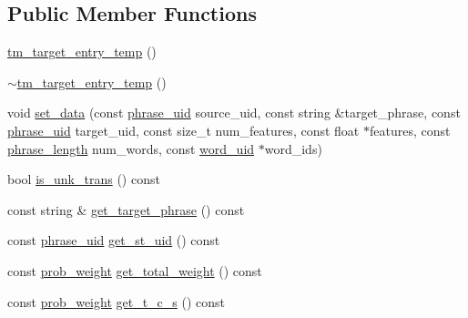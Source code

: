 \subsection*{Public Member Functions}
\begin{DoxyCompactItemize}
\item 
\hyperlink{classuva_1_1smt_1_1bpbd_1_1server_1_1tm_1_1models_1_1tm__target__entry__temp_a10d254c10a6cdeb7b5538d2fc1f29a96}{tm\+\_\+target\+\_\+entry\+\_\+temp} ()
\item 
\hyperlink{classuva_1_1smt_1_1bpbd_1_1server_1_1tm_1_1models_1_1tm__target__entry__temp_a07f3364da42bd07d8692ceefa95a60b3}{$\sim$tm\+\_\+target\+\_\+entry\+\_\+temp} ()
\item 
void \hyperlink{classuva_1_1smt_1_1bpbd_1_1server_1_1tm_1_1models_1_1tm__target__entry__temp_a019f83ab32f5b2b1c5becda8a0596732}{set\+\_\+data} (const \hyperlink{namespaceuva_1_1smt_1_1bpbd_1_1server_ad18d4cdf5504e76c22b0c124ff60b44f}{phrase\+\_\+uid} source\+\_\+uid, const string \&target\+\_\+phrase, const \hyperlink{namespaceuva_1_1smt_1_1bpbd_1_1server_ad18d4cdf5504e76c22b0c124ff60b44f}{phrase\+\_\+uid} target\+\_\+uid, const size\+\_\+t num\+\_\+features, const float $\ast$features, const \hyperlink{namespaceuva_1_1smt_1_1bpbd_1_1server_af068a19c2e03116caf3e3827a3e40e35}{phrase\+\_\+length} num\+\_\+words, const \hyperlink{namespaceuva_1_1smt_1_1bpbd_1_1server_a6bfe45ba344d65a7fdd7d26156328ddc}{word\+\_\+uid} $\ast$word\+\_\+ids)
\item 
bool \hyperlink{classuva_1_1smt_1_1bpbd_1_1server_1_1tm_1_1models_1_1tm__target__entry__temp_ae3569c030f9ddb80f02912f4f4ba724c}{is\+\_\+unk\+\_\+trans} () const 
\item 
const string \& \hyperlink{classuva_1_1smt_1_1bpbd_1_1server_1_1tm_1_1models_1_1tm__target__entry__temp_a89fd2815eb087a9abb47040d842597ce}{get\+\_\+target\+\_\+phrase} () const 
\item 
const \hyperlink{namespaceuva_1_1smt_1_1bpbd_1_1server_ad18d4cdf5504e76c22b0c124ff60b44f}{phrase\+\_\+uid} \hyperlink{classuva_1_1smt_1_1bpbd_1_1server_1_1tm_1_1models_1_1tm__target__entry__temp_a321df85fef6d385d5edc0afce9296045}{get\+\_\+st\+\_\+uid} () const 
\item 
const \hyperlink{namespaceuva_1_1smt_1_1bpbd_1_1server_a01e9ea4de9c226f4464862e84ff0bbcc}{prob\+\_\+weight} \hyperlink{classuva_1_1smt_1_1bpbd_1_1server_1_1tm_1_1models_1_1tm__target__entry__temp_ae6c8b88c36a4eeb73926291688df1774}{get\+\_\+total\+\_\+weight} () const 
\item 
const \hyperlink{namespaceuva_1_1smt_1_1bpbd_1_1server_a01e9ea4de9c226f4464862e84ff0bbcc}{prob\+\_\+weight} \hyperlink{classuva_1_1smt_1_1bpbd_1_1server_1_1tm_1_1models_1_1tm__target__entry__temp_ad971b065528c5763c4fb386db1a688b1}{get\+\_\+t\+\_\+c\+\_\+s} () const 

\end{DoxyCompactItemize}
